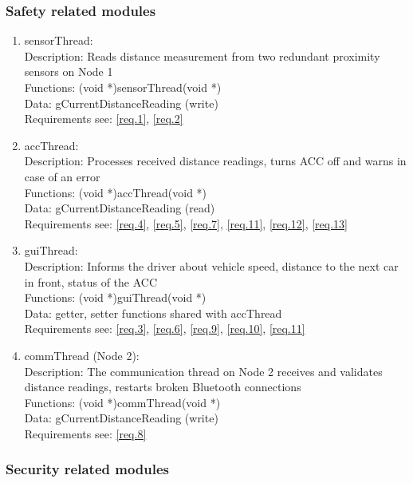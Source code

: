 \subsubsection{Safety related modules}
\begin{enumerate}
	\item sensorThread: \\
		Description: Reads distance measurement from two redundant proximity sensors on Node 1\\
		Functions: (void *)sensorThread(void *)\\
		Data: gCurrentDistanceReading (write)\\
		Requirements see: \ref{req.1}, \ref{req.2} \\
	\item accThread: \\
		Description: Processes received distance readings, turns ACC off and warns in case of an error \\
		Functions: (void *)accThread(void *)\\
		Data: gCurrentDistanceReading (read)\\
		Requirements see: \ref{req.4}, \ref{req.5}, \ref{req.7}, \ref{req.11}, \ref{req.12}, \ref{req.13} \\
	\item guiThread: \\
		Description: Informs the driver about vehicle speed, distance to the next car in front, status of the ACC \\
		Functions: (void *)guiThread(void *)\\
		Data: getter, setter functions shared with accThread \\
		Requirements see: \ref{req.3}, \ref{req.6}, \ref{req.9}, \ref{req.10}, \ref{req.11} \\
	\item commThread (Node 2): \\
		Description: The communication thread on Node 2 receives and validates distance readings, restarts broken Bluetooth connections \\
		Functions: (void *)commThread(void *)\\
		Data: gCurrentDistanceReading (write)\\
		Requirements see: \ref{req.8} \\
\end{enumerate}


\subsubsection{Security related modules}

